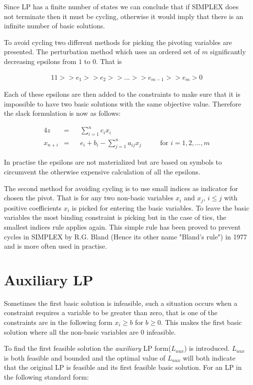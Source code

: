 Since LP has a finite number of states we can conclude that if SIMPLEX does not terminate then it must be cycling, otherwise it would imply that there is an infinite number of basic solutions.

To avoid cycling two different methods for picking the pivoting variables are presented. The perturbation method which uses an ordered set of $m$ significantly decreasing epsilons from $1$ to $0$. That is 

\begin{alignat}{1}
1 >> e_1 >> e_2 >> ... >> e_{m-1} >> e_m > 0
\end{alignat}

Each of these epsilons are then added to the constraints to make sure that it is impossible to have two basic solutions with the same objective value. Therefore the slack formulation is now as follows:

\begin{alignat}{4}
z        &= && \sum_{i=1}^{n} c_ix_i\\
x_{n+i}  &= && e_i+b_i - \sum_{j=1}^{n} a_{ij} x_j  &&& \text{ for } i=1,2,...,m
\end{alignat}

In practise the epsilons are not materialized but are based on symbols to circumvent the otherwise expensive calculation of all the epsilons.

The second method for avoiding cycling is to use small indices as indicator for chosen the pivot. That is for any two non-basic variables $x_i$ and $x_j$, $i \le j$ with positive coefficients $x_i$ is picked for entering the basic variables. To leave the basic variables the most binding constraint is picking but in the case of ties, the smallest indices rule applies again. This simple rule has been proved to prevent cycles in SIMPLEX by R.G. Bland (Hence its other name "Bland's rule") in 1977 and is more often used in practise.

\section{Auxiliary LP}
Sometimes the first basic solution is infeasible, such a situation occurs when a constraint requires a variable to be greater than zero, that is one of the constraints are in the following form $x_i \geq b $ for  $ b \ge 0 $. This makes the first basic solution where all the non-basic variables are $0$ infeasible. 

To find the first feasible solution the \textit{auxiliary} LP form($L_{aux}$) is introduced. $L_{aux}$ is both feasible and bounded and the optimal value of $L_{aux}$ will both indicate that the original LP is feasible and its first feasible basic solution. For an LP in the following standard form:

